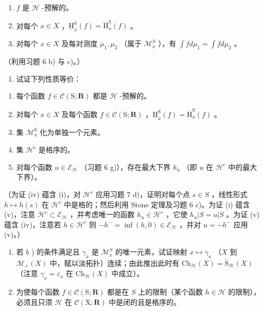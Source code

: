 \begin{enumerate}
\def\labelenumi{(\roman{enumi})}
\item
  \(f\) 是 \(\mathcal{H}\) -预解的。
\item
  对每个 \(x \in X\) ，\(\underline{\mathrm{H}}_x^{\mathrm{S}}(f) = \overline{\mathrm{H}}_x^{\mathrm{S}}(f)\) 。
\item
  对每个 \(x \in X\) 及每对测度 \(\mu_1, \mu_2\) （属于 \(\mathcal{M}_x^S\) ），有 \(\int f d\mu_1 = \int f d\mu_2\) 。
\end{enumerate}

（利用习题 6 b) 与 c)。）

\begin{enumerate}
\def\labelenumi{\alph{enumi})}
\setcounter{enumi}{1}
\tightlist
\item
  试证下列性质等价：
\end{enumerate}

\begin{enumerate}
\def\labelenumi{(\roman{enumi})}
\item
  每个函数 \(f \in \mathcal{C}(\mathrm{S};\mathbf{R})\) 都是 \(\mathcal{H}\) -预解的。
\item
  对每个 \(x \in X\) 及每个函数 \(f \in \mathcal{C}(\mathrm{S};\mathbf{R})\) ，\(\underline{\mathrm{H}}_x^{\mathrm{S}}(f) = \overline{\mathrm{H}}_x^{\mathrm{S}}(f)\) 。
\item
  集 \(\mathcal{M}_x^{\mathrm{S}}\) 化为单独一个元素。
\item
  集 \(\mathcal{H}^{\tilde{c}}\) 是格序的。
\item
  对每个函数 \(u \in \mathcal{E}_{\mathcal{H}}\) （习题 6 g)），存在最大下界 \(h_u\) （即 \(u\) 在 \(\mathcal{H}^c\) 中的最大下界）。
\end{enumerate}

（为证 (iv) 蕴含 (i)，对 \(\mathcal{H}^c\) 应用习题 7 d)，证明对每个点 \(s \in S\) ，线性形式 \(h \mapsto h(s)\) 在 \(\mathcal{H}^c\) 中是格的；然后利用 Stone 定理及习题 6 c)。为证 (i) 蕴含 (v)，注意 \(\mathcal{H}^c \subset \mathcal{E}_{\mathcal{H}}\) ，并考虑唯一的函数 \(h_u \in \mathcal{H}^c\) ，它使 \(h_u|S = u|S\) 。为证 (v) 蕴含 (iv)，注意若 \(h \in \mathcal{H}^c\) 则 \(-h^{-} = \inf(h,0) \in \mathcal{E}_{\mathcal{H}}\) ，并对 \(u = -h^{-}\) 应用 (v)。）

\begin{enumerate}
\def\labelenumi{\alph{enumi})}
\setcounter{enumi}{2}
\item
  若 \(b\) ) 的条件满足且 \(\gamma_x\) 是 \(\mathcal{M}_x^S\) 的唯一元素，试证映射 \(x \mapsto \gamma_x\) （\(X\) 到 \(\mathcal{M}_+(X)\) 中，赋以淡拓扑）连续；由此推出此时有 \(\mathrm{Ch}_{\mathcal{H}}(X) = \check{\mathrm{S}}_{\mathcal{H}}(X)\) （注意 \(\gamma_x = \varepsilon_x\) 在 \(\mathrm{Ch}_{\mathcal{H}}(X)\) 中成立）。
\item
  为使每个函数 \(f \in \mathcal{C}(\mathrm{S};\mathbf{R})\) 都是在 \(S\) 上的限制（某个函数 \(h \in \mathcal{H}\) 的限制），必须且只须 \(\mathcal{H}\) 在 \(\mathcal{C}(\mathrm{X};\mathbf{R})\) 中是闭的且是格序的。
\end{enumerate}

